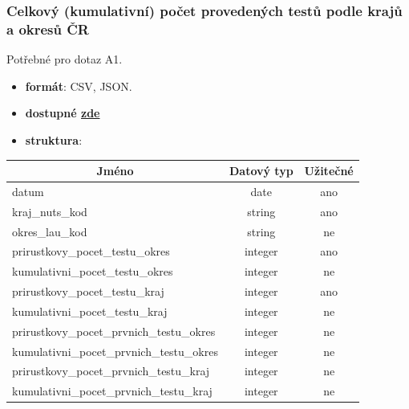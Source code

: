 \documentclass[12pt]{article}
\begin{document}
\subsubsection*{Celkový (kumulativní) počet provedených testů podle krajů a okresů ČR}
Potřebné pro dotaz A1.
\begin{itemize}
    \item \textbf{formát}: CSV, JSON.
    \item \textbf{dostupné  \href{https://onemocneni-aktualne.mzcr.cz/api/v2/covid-19/kraj-okres-testy.csv}{zde}}
    \item \textbf{struktura}:
\end{itemize}
        \begin{center}
            \begin{tabular}{ |l|c|c| } 
                \hline
                \multicolumn{1}{|c|}{Jméno} & Datový typ & Užitečné \\
                \hline
                \hline
                datum & date & ano \\ 
                \hline
                kraj\_nuts\_kod & string & ano \\ 
                \hline
                okres\_lau\_kod & string & ne \\ 
                \hline
                prirustkovy\_pocet\_testu\_okres & integer & ano \\ 
                \hline
                kumulativni\_pocet\_testu\_okres & integer & ne \\ 
                \hline
                prirustkovy\_pocet\_testu\_kraj & integer & ano \\ 
                \hline
                kumulativni\_pocet\_testu\_kraj & integer & ne \\ 
                \hline
                prirustkovy\_pocet\_prvnich\_testu\_okres & integer & ne \\ 
                \hline
                kumulativni\_pocet\_prvnich\_testu\_okres & integer & ne \\ 
                \hline
                prirustkovy\_pocet\_prvnich\_testu\_kraj & integer & ne \\ 
                \hline
                kumulativni\_pocet\_prvnich\_testu\_kraj & integer & ne \\ 
                \hline
            \end{tabular}
        \end{center}
\end{document}
